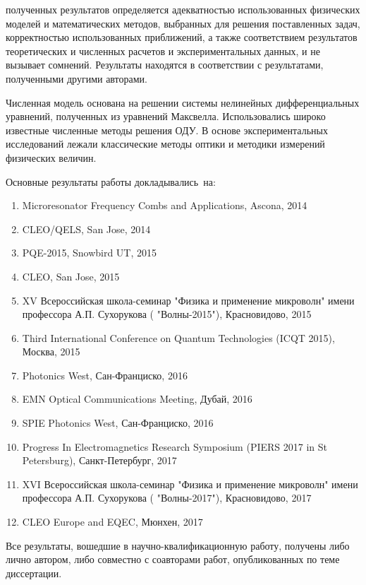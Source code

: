 {\reliability} полученных результатов определяется адекватностью использованных физических моделей и математических методов, выбранных для решения поставленных задач, корректностью использованных приближений, а также
соответствием результатов теоретических и численных расчетов и экспериментальных данных, и не вызывает сомнений. Результаты находятся в соответствии с результатами, полученными другими авторами.

Численная модель основана на решении системы нелинейных дифференциальных уравнений, полученных из уравнений Максвелла. Использовались широко известные численные методы решения ОДУ. В основе экспериментальных исследований лежали классические методы оптики и методики измерений физических величин.

{\probation}
Основные результаты работы докладывались~на:
\begin{enumerate}
  \item Microresonator Frequency Combs and Applications, Ascona, 2014
  \item CLEO/QELS, San Jose, 2014
  \item PQE-2015, Snowbird UT, 2015
  \item CLEO, San Jose, 2015
  \item XV Всероссийская школа-семинар "Физика и применение микроволн" имени профессора А.П. Сухорукова ( "Волны-2015"), Красновидово, 2015
  \item Third International Conference on Quantum Technologies (ICQT 2015), Москва, 2015
  \item Photonics West, Сан-Франциско, 2016
  \item EMN Optical Communications Meeting, Дубай, 2016
  \item SPIE Photonics West, Сан-Франциско, 2016
  \item Progress In Electromagnetics Research Symposium (PIERS 2017 in St Petersburg), Санкт-Петербург, 2017
  \item XVI Всероссийская школа-семинар "Физика и применение микроволн" имени профессора А.П. Сухорукова ( "Волны-2017"), Красновидово, 2017
  \item CLEO Europe and EQEC, Мюнхен, 2017
\end{enumerate}


{\contribution} Все результаты, вошедшие в научно-квалификационную работу, получены либо лично
автором, либо совместно с соавторами работ, опубликованных по теме диссертации.


